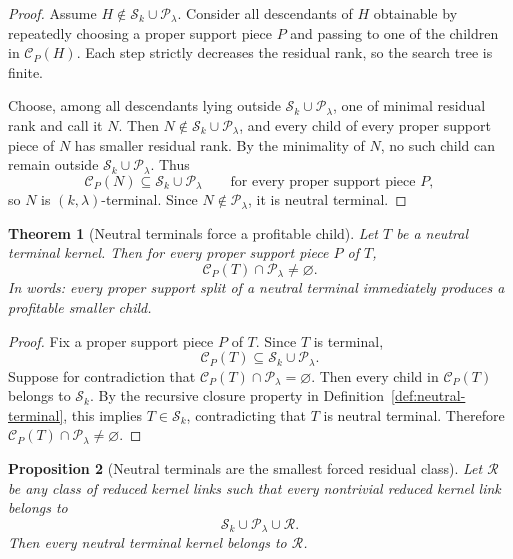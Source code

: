 \documentclass[11pt]{article}
\newtheorem{theorem}{Theorem}[section]
\newtheorem{proposition}[theorem]{Proposition}
\theoremstyle{definition}
\newcommand{\1}{\mathbf{1}}
\begin{document}
\begin{proof}
Assume $H\notin \mathcal S_k\cup \mathcal P_\lambda$. Consider all descendants of $H$ obtainable by repeatedly choosing a proper support piece $P$ and passing to one of the children in $\mathcal C_P(H)$. Each step strictly decreases the residual rank, so the search tree is finite.

Choose, among all descendants lying outside $\mathcal S_k\cup \mathcal P_\lambda$, one of minimal residual rank and call it $N$. Then $N\notin \mathcal S_k\cup \mathcal P_\lambda$, and every child of every proper support piece of $N$ has smaller residual rank. By the minimality of $N$, no such child can remain outside $\mathcal S_k\cup \mathcal P_\lambda$. Thus
\[
\mathcal C_P(N)\subseteq \mathcal S_k\cup \mathcal P_\lambda
\qquad\text{for every proper support piece }P,
\]
so $N$ is $(k,\lambda)$-terminal. Since $N\notin \mathcal P_\lambda$, it is neutral terminal.
\end{proof}

\begin{theorem}[Neutral terminals force a profitable child]\label{thm:neutral-terminal-child}
Let $T$ be a neutral terminal kernel. Then for every proper support piece $P$ of $T$,
\[
\mathcal C_P(T)\cap \mathcal P_\lambda\neq \varnothing.
\]
In words: every proper support split of a neutral terminal immediately produces a profitable smaller child.
\end{theorem}

\begin{proof}
Fix a proper support piece $P$ of $T$. Since $T$ is terminal,
\[
\mathcal C_P(T)\subseteq \mathcal S_k\cup \mathcal P_\lambda.
\]
Suppose for contradiction that $\mathcal C_P(T)\cap \mathcal P_\lambda=\varnothing$. Then every child in $\mathcal C_P(T)$ belongs to $\mathcal S_k$. By the recursive closure property in Definition~\ref{def:neutral-terminal}, this implies $T\in \mathcal S_k$, contradicting that $T$ is neutral terminal. Therefore $\mathcal C_P(T)\cap \mathcal P_\lambda\neq \varnothing$.
\end{proof}

\begin{proposition}[Neutral terminals are the smallest forced residual class]\label{prop:neutral-terminal-minimal}
Let $\mathcal R$ be any class of reduced kernel links such that every nontrivial reduced kernel link belongs to
\[
\mathcal S_k\cup \mathcal P_\lambda\cup \mathcal R.
\]
Then every neutral terminal kernel belongs to $\mathcal R$.
\end{proposition}
\end{document}
